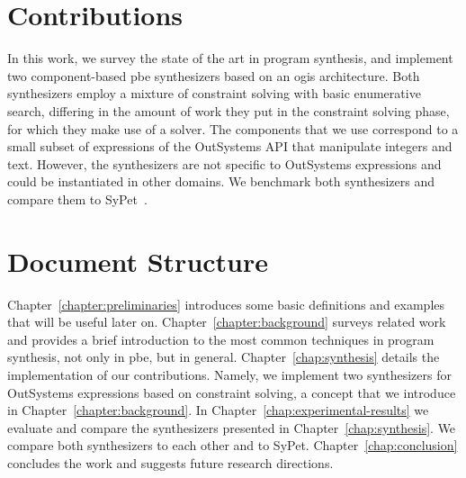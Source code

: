 \section{Contributions}

In this work, we survey the state of the art in program synthesis, and
implement two component-based \gls{pbe} synthesizers based on an \gls{ogis}
architecture.
Both synthesizers employ a mixture of constraint solving with basic enumerative
search, differing in the amount of work they put in the constraint solving
phase, for which they make use of a  solver.
The components that we use correspond to a small subset of expressions of the
OutSystems API that manipulate integers and text.
However, the synthesizers are not specific to OutSystems expressions and could
be instantiated in other domains.
We benchmark both synthesizers and compare them to SyPet~\cite{Feng:2017:CSC}.

\section{Document Structure}
\label{sec:structure}

Chapter~\ref{chapter:preliminaries} introduces some basic definitions and examples
that will be useful later on.
Chapter~\ref{chapter:background} surveys related work and provides a brief
introduction to the most common techniques in program synthesis, not only in
\gls{pbe}, but in general.
Chapter~\ref{chap:synthesis} details the implementation of our contributions.
Namely, we implement two synthesizers for OutSystems expressions based on
constraint solving, a concept that we introduce in
Chapter~\ref{chapter:background}.
In Chapter~\ref{chap:experimental-results} we evaluate and compare the
synthesizers presented in Chapter~\ref{chap:synthesis}.
We compare both synthesizers to each other and to SyPet.
Chapter~\ref{chap:conclusion} concludes the work and suggests future research
directions.